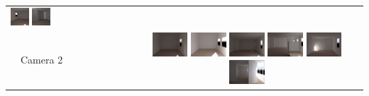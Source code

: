 \documentclass[landscape,20pt]{sciposter}
\begin{document}
\begin{minipage}[t]{17in}
\begin{tabular}{lc}
  \includegraphics[width=0.158\textwidth]{../gi2012_userstudy/images/renderings/renovations/042_camera_chris_december}
  \includegraphics[width=0.158\textwidth]{../gi2012_userstudy/images/renderings/renovations/042_camera_chris_december_mod}
  \\
\begin{sideways}~~Camera 2\end{sideways}&
  \includegraphics[width=0.158\textwidth]{../gi2012_userstudy/images/renderings/renovations/065_camera_dark_march_crop.png}
  \includegraphics[width=0.158\textwidth]{../gi2012_userstudy/images/renderings/renovations/065_camera_dark_march_mod_crop.png}
  \includegraphics[width=0.158\textwidth]{../gi2012_userstudy/images/renderings/renovations/user_046_camera_dark_march_crop.png}
  \includegraphics[width=0.158\textwidth]{../gi2012_userstudy/images/renderings/renovations/user_046_camera_dark_march_mod_crop.png}
  \includegraphics[width=0.158\textwidth]{../gi2012_userstudy/images/renderings/renovations/042_camera_dark_december_crop.png}
  \includegraphics[width=0.158\textwidth]{../gi2012_userstudy/images/renderings/renovations/042_camera_dark_december_mod_crop.png}



\end{tabular}
\end{minipage}
\end{document}
